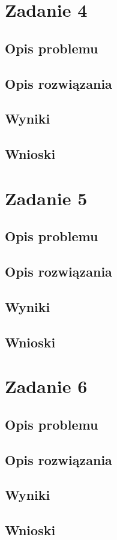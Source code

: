 \documentclass{classrep}
\begin{document}
\section{Zadanie 4}
	\subsection{Opis problemu}
	\subsection{Opis rozwiązania}
	\subsection{Wyniki}
	\subsection{Wnioski}
\section{Zadanie 5}
	\subsection{Opis problemu}
	\subsection{Opis rozwiązania}
	\subsection{Wyniki}
	\subsection{Wnioski}
\section{Zadanie 6}
	\subsection{Opis problemu}
	\subsection{Opis rozwiązania}
	\subsection{Wyniki}
	\subsection{Wnioski}
\end{document}
